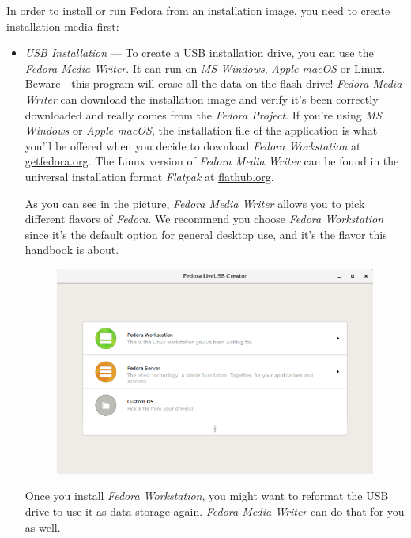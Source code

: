 In order to install or run Fedora from an installation image, you need to create installation media first:
\begin{itemize}
\item\emph{USB Installation} --- To create a USB installation drive, you can use the \emph{Fedora Media Writer}. It can run on \emph{MS Windows}, \emph{Apple macOS} or Linux. Beware---this program will erase all the data on the flash drive! \emph{Fedora Media Writer} can download the installation image and verify it's been correctly downloaded and really comes from the \emph{Fedora Project}. If you're using \emph{MS Windows} or \emph{Apple macOS}, the installation file of the application is what you'll be offered when you decide to download \emph{Fedora Workstation} at \url{getfedora.org}. The Linux version of \emph{Fedora Media Writer} can be found in the universal installation format \emph{Flatpak} at \url{flathub.org}.

As you can see in the picture, \emph{Fedora Media Writer} allows you to pick different flavors of \emph{Fedora}. We recommend you choose \emph{Fedora Workstation} since it's the default option for general desktop use, and it's the flavor this handbook is about.

\begin{figure}[htbp]
\begin{center}
\includegraphics[width=.75\textwidth]{img/fedora-media-writer}
 \label{fig:fedora_media_writer}
\end{center}
\end{figure}

Once you install \emph{Fedora Workstation}, you might want to reformat the USB drive to use it as data storage again. \emph{Fedora Media Writer} can do that for you as well.



\end{itemize}
